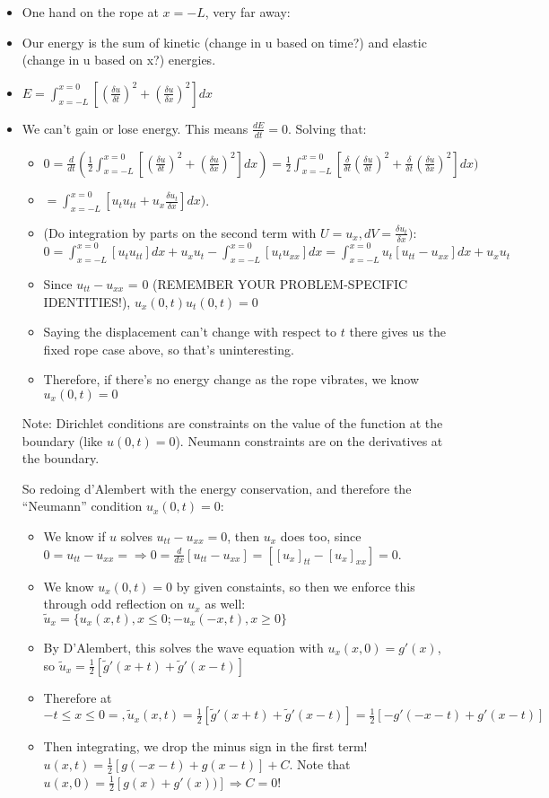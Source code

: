 \documentclass[11pt, oneside]{article}   	%
\begin{document}
\begin{itemize}
\item One hand on the rope at $x=-L$, very far away:
\item Our energy is the sum of kinetic (change in u based on time?) and elastic (change in u based on x?) energies.
\item $E = \int_{x=-L}^{x=0} [(\frac{\delta u}{\delta t})^2 + (\frac{\delta u}{\delta x})^2]dx$
\item We can't gain or lose energy.  This means $\frac{dE}{dt} = 0$. Solving that:
\begin{itemize}
\item $0 = \frac{d}{dt} ( \frac{1}{2} \int_{x=-L}^{x=0} [(\frac{\delta u}{\delta t})^2 + (\frac{\delta u}{\delta x})^2]dx)  = \frac{1}{2} \int_{x=-L}^{x=0} [ \frac{\delta}{\delta t} (\frac{\delta u}{\delta t})^2 + \frac{\delta}{\delta t} (\frac{\delta u}{\delta x})^2]dx)$
\item $= \int_{x=-L}^{x=0} [ u_t u_{tt} + u_x \frac{\delta u_t}{\delta x}]dx)$.  
\item (Do integration by parts on the second term with $U = u_x, dV= \frac{\delta u_t}{\delta x})$: $0 = \int_{x=-L}^{x=0} [ u_t u_{tt}]dx + u_xu_t - \int_{x=-L}^{x=0} [u_tu_{xx}]dx =  \int_{x=-L}^{x=0} u_t[u_{tt} - u_{xx}]dx + u_xu_t$
\item Since $u_{tt} - u_{xx}$ = 0 (REMEMBER YOUR PROBLEM-SPECIFIC IDENTITIES!), $u_x(0,t)u_t(0,t) = 0$
\item Saying the displacement can't change with respect to $t$ there gives us the fixed rope case above, so that's uninteresting.
\item Therefore, if there's no energy change as the rope vibrates, we know $u_x(0,t) = 0$
\end{itemize}

Note: Dirichlet conditions are constraints on the value of the function at the boundary (like $u(0, t) = 0$).  Neumann constraints are on the derivatives at the boundary.

So redoing d'Alembert with the energy conservation, and therefore the ``Neumann'' condition $u_x(0,t) = 0$:
\begin{itemize} 
\item We know if $u$ solves $u_{tt} - u_{xx} = 0$, then $u_x$ does too, since $0 = u_{tt} - u_{xx} = \Rightarrow  0 = \frac{d}{dx}[u_{tt} - u_{xx}] = [[u_x]_{tt} - [u_x]_{xx}] = 0$.
\item We know $u_x(0,t) = 0$ by given constaints, so then we enforce this through odd reflection on $u_x$ as well: $\tilde{u}_x = \{ u_x(x,t), x\leq 0; -u_x(-x,t), x \geq 0\}$
\item By D'Alembert, this solves the wave equation with $u_x(x,0) = g'(x)$, so $\tilde{u}_x = \frac{1}{2}[\tilde{g}'(x+t) + \tilde{g}'(x-t)]$
\item Therefore at $-t \leq x \leq 0=, \tilde{u}_x(x,t) = \frac{1}{2}[\tilde{g}'(x+t) + \tilde{g}'(x-t)] = \frac{1}{2}[- g'(-x-t) + g'(x-t)]$
\item Then integrating, we drop the minus sign in the first term! $u(x,t) =  \frac{1}{2}[g(-x-t) + g(x-t)] + C$.  Note that $u(x,0) =  \frac{1}{2}[g(x) + g'(x))] \Rightarrow C = 0$!
\end{itemize}


\end{itemize}
\end{document}
